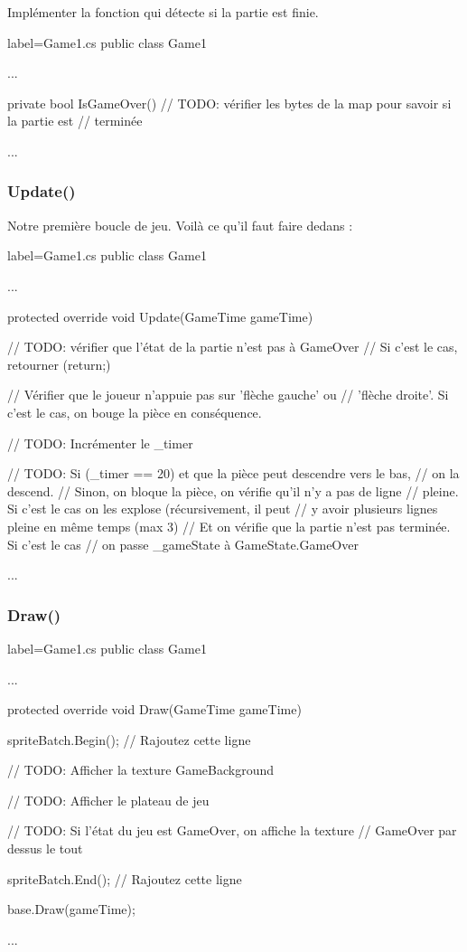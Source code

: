 \documentclass[a4paper]{article}
\begin{document}
Implémenter la fonction qui détecte si la partie est finie. \\

\begin{csharpcode*}{label=Game1.cs}
public class Game1
{
    ...

    private bool IsGameOver()
    {
        // TODO: vérifier les bytes de la map pour savoir si la partie est
        //       terminée
    }
    
    ...
}
\end{csharpcode*}

\subsubsection{Update()}

Notre première boucle de jeu. Voilà ce qu'il faut faire dedans : \\

\begin{csharpcode*}{label=Game1.cs}
public class Game1
{
    ...

    protected override void Update(GameTime gameTime)
    {
        // TODO: vérifier que l'état de la partie n'est pas à GameOver
        //       Si c'est le cas, retourner (return;)

        // Vérifier que le joueur n'appuie pas sur 'flèche gauche' ou
        // 'flèche droite'. Si c'est le cas, on bouge la pièce en conséquence.

        // TODO: Incrémenter le _timer

        // TODO: Si (_timer == 20) et que la pièce peut descendre vers le bas,
        //          on la descend.
        //       Sinon, on bloque la pièce, on vérifie qu'il n'y a pas de ligne
        //          pleine. Si c'est le cas on les explose (récursivement, il peut
        //          y avoir plusieurs lignes pleine en même temps (max 3)
        //       Et on vérifie que la partie n'est pas terminée. Si c'est le cas
        //          on passe _gameState à GameState.GameOver
    }

    ...
}
\end{csharpcode*}

\subsubsection{Draw()}

\begin{csharpcode*}{label=Game1.cs}
public class Game1
{
    ...

    protected override void Draw(GameTime gameTime)
    {
        spriteBatch.Begin(); // Rajoutez cette ligne

        // TODO: Afficher la texture GameBackground

        // TODO: Afficher le plateau de jeu

        // TODO: Si l'état du jeu est GameOver, on affiche la texture
        //       GameOver par dessus le tout

        spriteBatch.End(); // Rajoutez cette ligne

        base.Draw(gameTime);
    }

    ...
}    
\end{csharpcode*}
\end{document}
